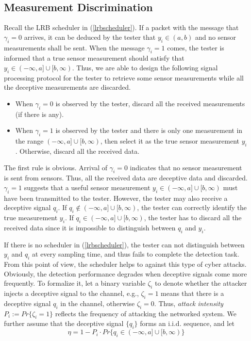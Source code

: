 \documentclass[journal]{IEEEtran}
\begin{document}
\subsection{Measurement Discrimination}
Recall the LRB scheduler in (\ref{lrbscheduler}). If a packet with the message that $\gamma_i=0$ arrives,  it can be deduced by the tester that $y_i\in (a,b)$ and no sensor measurements shall be sent. When the message $\gamma_i=1$ comes, the tester is informed that a true sensor measurement should satisfy that $y_i\in(-\infty,a]\cup[b,\infty)$. Thus, we are able to design the following signal processing protocol for the tester to retrieve some sensor measurements while all the deceptive measurements are discarded.

\begin{itemize}
\item When $\gamma_i=0$ is observed by the tester, discard all the received measurements (if there is any).
\item When  $\gamma_i=1$ is observed by the tester and there is only one measurement  in the range $(-\infty,a]\cup[b,\infty)$, then select it as the true sensor measurement $y_i$. Otherwise, discard all the received data.
\end{itemize}

The first rule is obvious. Arrival of  $\gamma_i=0$ indicates that no sensor measurement is sent from sensors. Thus, all the received data are deceptive data and discarded. $\gamma_i=1$ suggests that a useful sensor measurement $y_i\in(-\infty,a]\cup[b,\infty)$ must have been transmitted to the tester. However, the tester may also receive a deceptive signal $q_i$. If $q_i\notin (-\infty,a]\cup[b,\infty)$, the tester can correctly identify the true measurement $y_i$. If $q_i\in (-\infty,a]\cup[b,\infty)$,  the tester has to discard all the received data since it is impossible to distinguish between $q_i$ and $y_i$.

If there is no scheduler in (\ref{lrbscheduler}), the tester can not distinguish between $y_i$ and $q_i$ at every sampling time, and thus fails to complete the detection task. From this point of view, the scheduler helps to against this type of cyber attacks. Obviously, the  detection performance degrades when deceptive signals come more frequently. To formalize it, let a binary variable $\zeta_i$ to denote whether the attacker injects a deceptive signal to the channel, e.g., $\zeta_i=1$ means that there is a deceptive signal $q_i$ in the channel, otherwise $\zeta_i=0$. Thus, {\it attack intensity} $P_i:=Pr\{\zeta_i=1\}$ reflects the frequency of attacking the networked system. We further assume that the deceptive signal $\{q_i\}$ forms an i.i.d. sequence, and let
\begin{equation}
\label{attackintensity}
\eta=1-P_i\cdot Pr\{q_i\in (-\infty,a]\cup[b,\infty)\}
\end{equation}
\end{document}
